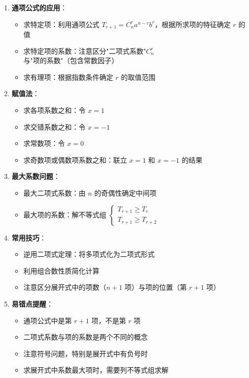 \documentclass[11pt]{ctexrep}
\begin{document}
\begin{enumerate}
    \item \textbf{通项公式的应用}：
    \begin{itemize}
        \item 求特定项：利用通项公式 $T_{r+1} = C_n^r a^{n-r}b^r$，根据所求项的特征确定 $r$ 的值
        \item 求特定项的系数：注意区分"二项式系数"$C_n^r$ 与"项的系数"（包含常数因子）
        \item 求有理项：根据指数条件确定 $r$ 的取值范围
    \end{itemize}
    
    \item \textbf{赋值法}：
    \begin{itemize}
        \item 求各项系数之和：令 $x = 1$
        \item 求交错系数之和：令 $x = -1$
        \item 求常数项：令 $x = 0$
        \item 求奇数项或偶数项系数之和：联立 $x = 1$ 和 $x = -1$ 的结果
    \end{itemize}
    
    \item \textbf{最大系数问题}：
    \begin{itemize}
        \item 最大二项式系数：由 $n$ 的奇偶性确定中间项
        \item 最大项的系数：解不等式组 $\begin{cases} T_{r+1} \geq T_r \\ T_{r+1} \geq T_{r+2} \end{cases}$
    \end{itemize}
    
    \item \textbf{常用技巧}：
    \begin{itemize}
        \item 逆用二项式定理：将多项式化为二项式形式
        \item 利用组合数性质简化计算
        \item 注意区分展开式中的项数（$n+1$ 项）与项的位置（第 $r+1$ 项）
    \end{itemize}
    
    \item \textbf{易错点提醒}：
    \begin{itemize}
        \item 通项公式中是第 $r+1$ 项，不是第 $r$ 项
        \item 二项式系数与项的系数是两个不同的概念
        \item 注意符号问题，特别是展开式中有负号时
        \item 求展开式中系数最大项时，需要列不等式组求解
    \end{itemize}
\end{enumerate}
\end{document}

